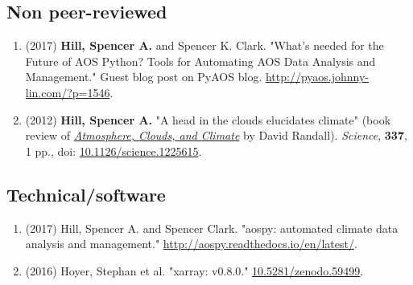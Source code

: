 \documentclass[12pt,letterpaper]{shillcv}
\begin{document}
\subsection*{Non peer-reviewed}
\label{sec:org5f91761}
\begin{enumerate}
\item (2017) \textbf{Hill, Spencer A.} and Spencer K. Clark.  "What’s needed for the Future
of AOS Python? Tools for Automating AOS Data Analysis and Management."  Guest
blog post on PyAOS blog.  \url{http://pyaos.johnny-lin.com/?p=1546}.
\item (2012) \textbf{Hill, Spencer A.}  "A head in the clouds elucidates climate" (book
review of \href{http://press.princeton.edu/titles/9773.html}{\emph{Atmosphere, Clouds, and Climate}} by David Randall). \emph{Science}, \textbf{337},
1 pp., doi: \href{http://dx.doi.org/10.1126/science.1225615}{10.1126/science.1225615}.
\end{enumerate}
\subsection*{Technical/software}
\label{sec:orgaa054db}
\begin{enumerate}
\item (2017) Hill, Spencer A. and Spencer Clark.  "aospy: automated climate data
analysis and management."  \url{http://aospy.readthedocs.io/en/latest/}.
\item (2016) Hoyer, Stephan et al.  "xarray: v0.8.0."  \href{https://doi.org/10.5281/zenodo.59499}{10.5281/zenodo.59499}.
\end{enumerate}
\end{document}
